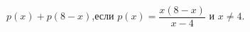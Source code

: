 \begin{ex}[type=calculate_expression]
	\begin{condition}
		\( p(x)+p(8-x) \),\quad если \( p(x)=\dfrac{x(8-x)}{x-4} \) и \( x\neq4 \).
	\end{condition}
\end{ex}